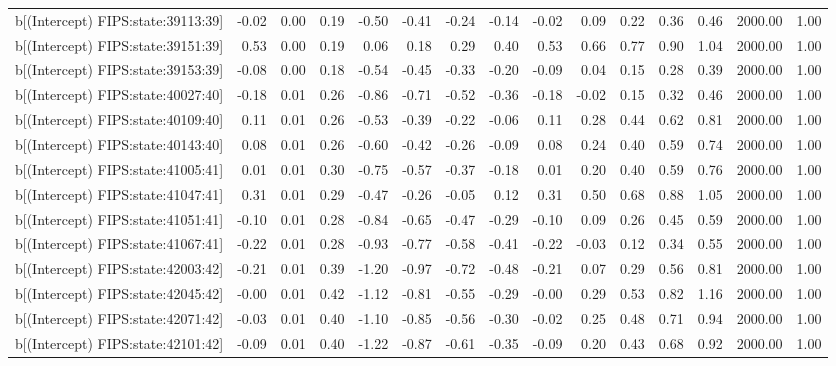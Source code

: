 \begin{table}[ht]
\begin{tabular}{rrrrrrrrrrrrrrr}
  b[(Intercept) FIPS:state:39113:39] & -0.02 & 0.00 & 0.19 & -0.50 & -0.41 & -0.24 & -0.14 & -0.02 & 0.09 & 0.22 & 0.36 & 0.46 & 2000.00 & 1.00 \\ 
  b[(Intercept) FIPS:state:39151:39] & 0.53 & 0.00 & 0.19 & 0.06 & 0.18 & 0.29 & 0.40 & 0.53 & 0.66 & 0.77 & 0.90 & 1.04 & 2000.00 & 1.00 \\ 
  b[(Intercept) FIPS:state:39153:39] & -0.08 & 0.00 & 0.18 & -0.54 & -0.45 & -0.33 & -0.20 & -0.09 & 0.04 & 0.15 & 0.28 & 0.39 & 2000.00 & 1.00 \\ 
  b[(Intercept) FIPS:state:40027:40] & -0.18 & 0.01 & 0.26 & -0.86 & -0.71 & -0.52 & -0.36 & -0.18 & -0.02 & 0.15 & 0.32 & 0.46 & 2000.00 & 1.00 \\ 
  b[(Intercept) FIPS:state:40109:40] & 0.11 & 0.01 & 0.26 & -0.53 & -0.39 & -0.22 & -0.06 & 0.11 & 0.28 & 0.44 & 0.62 & 0.81 & 2000.00 & 1.00 \\ 
  b[(Intercept) FIPS:state:40143:40] & 0.08 & 0.01 & 0.26 & -0.60 & -0.42 & -0.26 & -0.09 & 0.08 & 0.24 & 0.40 & 0.59 & 0.74 & 2000.00 & 1.00 \\ 
  b[(Intercept) FIPS:state:41005:41] & 0.01 & 0.01 & 0.30 & -0.75 & -0.57 & -0.37 & -0.18 & 0.01 & 0.20 & 0.40 & 0.59 & 0.76 & 2000.00 & 1.00 \\ 
  b[(Intercept) FIPS:state:41047:41] & 0.31 & 0.01 & 0.29 & -0.47 & -0.26 & -0.05 & 0.12 & 0.31 & 0.50 & 0.68 & 0.88 & 1.05 & 2000.00 & 1.00 \\ 
  b[(Intercept) FIPS:state:41051:41] & -0.10 & 0.01 & 0.28 & -0.84 & -0.65 & -0.47 & -0.29 & -0.10 & 0.09 & 0.26 & 0.45 & 0.59 & 2000.00 & 1.00 \\ 
  b[(Intercept) FIPS:state:41067:41] & -0.22 & 0.01 & 0.28 & -0.93 & -0.77 & -0.58 & -0.41 & -0.22 & -0.03 & 0.12 & 0.34 & 0.55 & 2000.00 & 1.00 \\ 
  b[(Intercept) FIPS:state:42003:42] & -0.21 & 0.01 & 0.39 & -1.20 & -0.97 & -0.72 & -0.48 & -0.21 & 0.07 & 0.29 & 0.56 & 0.81 & 2000.00 & 1.00 \\ 
  b[(Intercept) FIPS:state:42045:42] & -0.00 & 0.01 & 0.42 & -1.12 & -0.81 & -0.55 & -0.29 & -0.00 & 0.29 & 0.53 & 0.82 & 1.16 & 2000.00 & 1.00 \\ 
  b[(Intercept) FIPS:state:42071:42] & -0.03 & 0.01 & 0.40 & -1.10 & -0.85 & -0.56 & -0.30 & -0.02 & 0.25 & 0.48 & 0.71 & 0.94 & 2000.00 & 1.00 \\ 
  b[(Intercept) FIPS:state:42101:42] & -0.09 & 0.01 & 0.40 & -1.22 & -0.87 & -0.61 & -0.35 & -0.09 & 0.20 & 0.43 & 0.68 & 0.92 & 2000.00 & 1.00 \\ 

\end{tabular}
\end{table}

